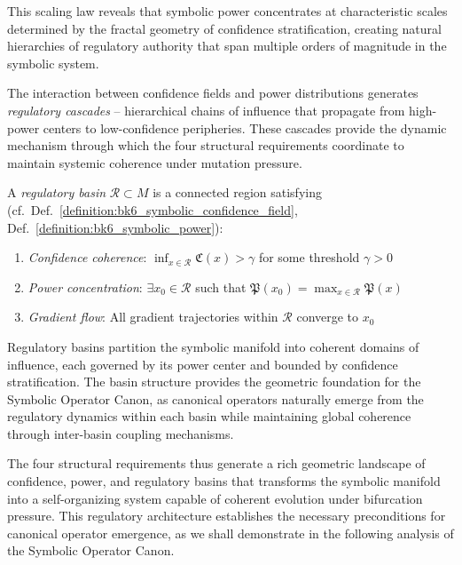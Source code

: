 This scaling law reveals that symbolic power concentrates at characteristic scales determined by the fractal geometry of confidence stratification, creating natural hierarchies of regulatory authority that span multiple orders of magnitude in the symbolic system.

The interaction between confidence fields and power distributions generates \emph{regulatory cascades} -- hierarchical chains of influence that propagate from high-power centers to low-confidence peripheries. These cascades provide the dynamic mechanism through which the four structural requirements coordinate to maintain systemic coherence under mutation pressure.

\begin{definition}
\label{definition:bk6_regulatory_basin}
A \emph{regulatory basin} $\mathcal{R} \subset M$ is a connected region satisfying (cf.~Def.~\ref{definition:bk6_symbolic_confidence_field}, Def.~\ref{definition:bk6_symbolic_power}):
\begin{enumerate}
\item \emph{Confidence coherence}: $\inf_{x \in \mathcal{R}} \mathfrak{C}(x) > \gamma$ for some threshold $\gamma > 0$
\item \emph{Power concentration}: $\exists x_0 \in \mathcal{R}$ such that $\mathfrak{P}(x_0) = \max_{x \in \mathcal{R}} \mathfrak{P}(x)$
\item \emph{Gradient flow}: All gradient trajectories within $\mathcal{R}$ converge to $x_0$
\end{enumerate}
\end{definition}

Regulatory basins partition the symbolic manifold into coherent domains of influence, each governed by its power center and bounded by confidence stratification. The basin structure provides the geometric foundation for the Symbolic Operator Canon, as canonical operators naturally emerge from the regulatory dynamics within each basin while maintaining global coherence through inter-basin coupling mechanisms.

The four structural requirements thus generate a rich geometric landscape of confidence, power, and regulatory basins that transforms the symbolic manifold into a self-organizing system capable of coherent evolution under bifurcation pressure. This regulatory architecture establishes the necessary preconditions for canonical operator emergence, as we shall demonstrate in the following analysis of the Symbolic Operator Canon.
